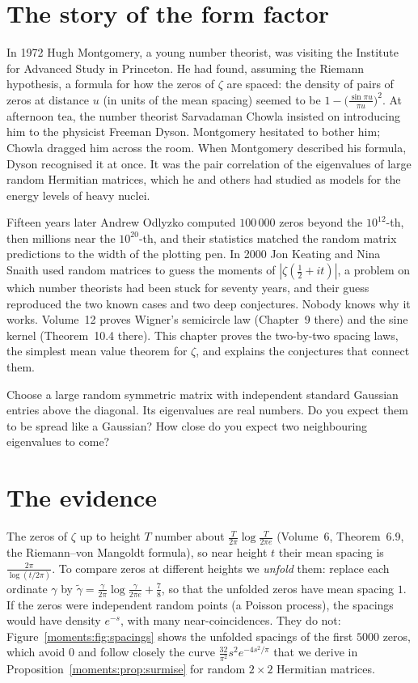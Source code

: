 \section{The story of the form factor}\label{moments:ch:zetarmt}

In 1972 Hugh Montgomery, a young number theorist, was visiting the Institute for Advanced Study in Princeton. He had
found, assuming the Riemann hypothesis, a formula for how the zeros of $\zeta$ are spaced: the density of pairs of zeros at distance $u$ (in units of
the mean spacing) seemed to be $1-\bigl(\frac{\sin\pi u}{\pi u}\bigr)^2$. At afternoon tea, the number theorist Sarvadaman Chowla insisted on
introducing him to the physicist Freeman Dyson. Montgomery hesitated to bother him; Chowla dragged him across the room. When Montgomery described his
formula, Dyson recognised it at once. It was the pair correlation of the eigenvalues of large random Hermitian matrices, which he and others had
studied as models for the energy levels of heavy nuclei.

Fifteen years later Andrew Odlyzko computed $100\,000$ zeros beyond the $10^{12}$-th, then millions near the $10^{20}$-th, and their statistics matched
the random matrix predictions to the width of the plotting pen. In 2000 Jon Keating and Nina Snaith used random matrices to guess the moments of
$|\zeta(\frac12+it)|$, a problem on which number theorists had been stuck for seventy years, and their guess reproduced the two known cases and two
deep conjectures. Nobody knows why it works. Volume~12 proves Wigner's semicircle law (Chapter~9 there) and the sine kernel (Theorem~10.4 there). This chapter proves the two-by-two spacing laws, the simplest mean value theorem for $\zeta$, and explains the conjectures that connect them.

\begin{think}
Choose a large random symmetric matrix with independent standard Gaussian entries above the diagonal. Its eigenvalues are real numbers. Do you expect them
to be spread like a Gaussian? How close do you expect two neighbouring eigenvalues to come?
\end{think}

\section{The evidence}

The zeros of $\zeta$ up to height $T$ number about $\frac T{2\pi}\log\frac T{2\pi e}$ (Volume~6, Theorem~6.9, the Riemann--von Mangoldt formula), so near height $t$ their mean spacing is
$\frac{2\pi}{\log(t/2\pi)}$. To compare zeros at different heights we \emph{unfold} them: replace each ordinate $\gamma$ by
$\tilde\gamma=\frac\gamma{2\pi}\log\frac\gamma{2\pi e}+\frac78$, so that the unfolded zeros have mean spacing $1$. If the zeros were independent random points
(a Poisson process), the spacings would have density $e^{-s}$, with many near-coincidences. They do not: Figure~\ref{moments:fig:spacings} shows the unfolded
spacings of the first $5000$ zeros, which avoid $0$ and follow closely the curve $\frac{32}{\pi^2}s^2e^{-4s^2/\pi}$ that we derive in
Proposition~\ref{moments:prop:surmise} for random $2\times2$ Hermitian matrices.


